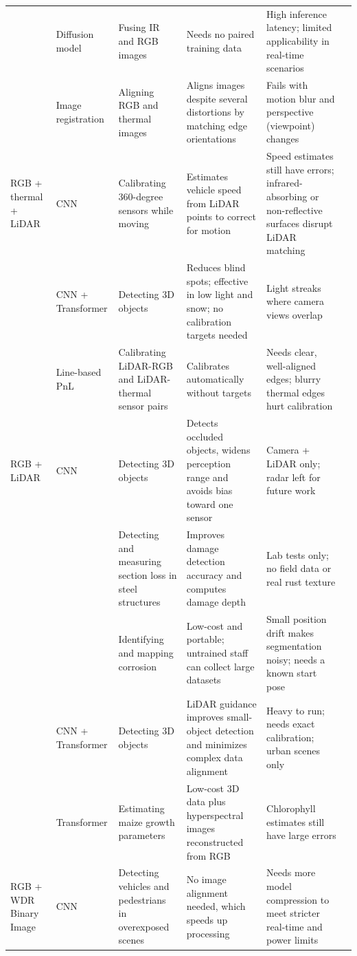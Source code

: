 {\begin{xltabular}{\textwidth}{>{\RaggedRight\arraybackslash}p{1.6cm}>{\RaggedRight\arraybackslash}p{2.2cm}>{\RaggedRight\arraybackslash}p{2.3cm}>{\RaggedRight\arraybackslash}X>{\RaggedRight\arraybackslash}Xp{0.95cm}}
 & Diffusion model & Fusing IR and RGB images & Needs no paired training data & High inference latency; limited applicability in real-time scenarios & \citep{Zhou2026} \\
 & Image registration & Aligning RGB and thermal images & Aligns images despite several distortions by matching edge orientations & Fails with motion blur and perspective (viewpoint) changes & \citep{Bin2023} \\
\midrule
RGB + thermal + LiDAR & CNN & Calibrating 360-degree sensors while moving & Estimates vehicle speed from LiDAR points to correct for motion & Speed estimates still have errors; infrared-absorbing or non-reflective surfaces disrupt LiDAR matching & \citep{Tran2024} \\
 & CNN + Transformer & Detecting 3D objects & Reduces blind spots; effective in low light and snow; no calibration targets needed & Light streaks where camera views overlap & \citep{Tran2025} \\
 & Line-based PnL & Calibrating LiDAR-RGB and LiDAR-thermal sensor pairs & Calibrates automatically without targets & Needs clear, well-aligned edges; blurry thermal edges hurt calibration & \citep{Yang2024} \\
\midrule
RGB + LiDAR & CNN & Detecting 3D objects & Detects occluded objects, widens perception range and avoids bias toward one sensor & Camera + LiDAR only; radar left for future work & \citep{Zhang2026d} \\
 &  & Detecting and measuring section loss in steel structures & Improves damage detection accuracy and computes damage depth & Lab tests only; no field data or real rust texture & \citep{Maru2025} \\
 &  & Identifying and mapping corrosion & Low-cost and portable; untrained staff can collect large datasets & Small position drift makes segmentation noisy; needs a known start pose & \citep{PimenteldeFigueiredo2025} \\
 & CNN + Transformer & Detecting 3D objects & LiDAR guidance improves small-object detection and minimizes complex data alignment & Heavy to run; needs exact calibration; urban scenes only & \citep{Cheng2025} \\
 & Transformer & Estimating maize growth parameters & Low-cost 3D data plus hyperspectral images reconstructed from RGB & Chlorophyll estimates still have large errors & \citep{Tang2025} \\
\midrule
RGB + WDR Binary Image & CNN & Detecting vehicles and pedestrians in overexposed scenes & No image alignment needed, which speeds up processing & Needs more model compression to meet stricter real-time and power limits & \citep{Byeon2026} \\

\end{xltabular}}
